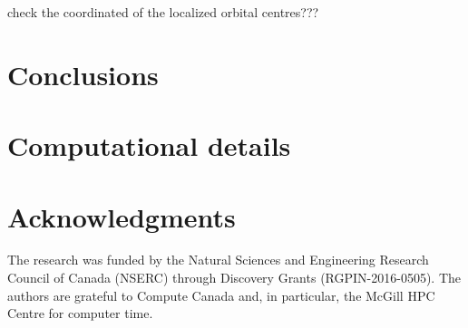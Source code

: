 \documentclass[aps,prl,reprint,amsmath,amssymb]{revtex4-1}
\begin{document}
check the coordinated of the localized orbital centres???

\section{Conclusions}


\section{Computational details}


\section{Acknowledgments} 

The research was funded by the Natural Sciences and Engineering Research Council of Canada (NSERC) through Discovery
Grants (RGPIN-2016-0505). The authors are grateful to Compute Canada and, in particular, the McGill HPC Centre for computer time.



\end{document}
